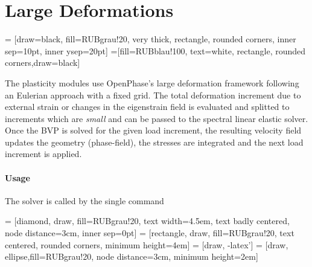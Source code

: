 \section{Large Deformations}
\label{sec:module_largedeformations}
 = [draw=black, fill=RUBgrau!20, very thick, rectangle, rounded corners, inner sep=10pt, inner ysep=20pt]
 =[fill=RUBblau!100, text=white, rectangle, rounded corners,draw=black]


The plasticity modules use OpenPhase's large deformation framework following an Eulerian approach with a fixed grid. The total deformation increment due to external strain or changes in the eigenstrain field is evaluated and splitted to increments which are \emph{small} and can be passed to the spectral linear elastic solver. Once the BVP is solved for the given load increment, the resulting velocity field updates the geometry (phase-field), the stresses are integrated and the next load increment is applied.
\paragraph{Usage} The solver is called by the single command 

 = [diamond, draw, fill=RUBgrau!20, 
    text width=4.5em, text badly centered, node distance=3cm, inner sep=0pt]
 = [rectangle, draw, fill=RUBgrau!20,  text centered, rounded corners, minimum height=4em]
 = [draw, -latex']
 = [draw, ellipse,fill=RUBgrau!20, node distance=3cm,
    minimum height=2em]
    
